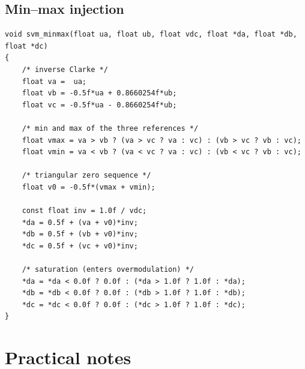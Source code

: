 \documentclass[11pt,a4paper]{article}
\begin{document}
\subsection{Min--max injection}

\begin{lstlisting}[caption={Carrier-based SVM with triangular injection.}]
void svm_minmax(float ua, float ub, float vdc, float *da, float *db, float *dc)
{
    /* inverse Clarke */
    float va =  ua;
    float vb = -0.5f*ua + 0.8660254f*ub;
    float vc = -0.5f*ua - 0.8660254f*ub;

    /* min and max of the three references */
    float vmax = va > vb ? (va > vc ? va : vc) : (vb > vc ? vb : vc);
    float vmin = va < vb ? (va < vc ? va : vc) : (vb < vc ? vb : vc);

    /* triangular zero sequence */
    float v0 = -0.5f*(vmax + vmin);

    const float inv = 1.0f / vdc;
    *da = 0.5f + (va + v0)*inv;
    *db = 0.5f + (vb + v0)*inv;
    *dc = 0.5f + (vc + v0)*inv;

    /* saturation (enters overmodulation) */
    *da = *da < 0.0f ? 0.0f : (*da > 1.0f ? 1.0f : *da);
    *db = *db < 0.0f ? 0.0f : (*db > 1.0f ? 1.0f : *db);
    *dc = *dc < 0.0f ? 0.0f : (*dc > 1.0f ? 1.0f : *dc);
}
\end{lstlisting}

\section{Practical notes}
\end{document}
